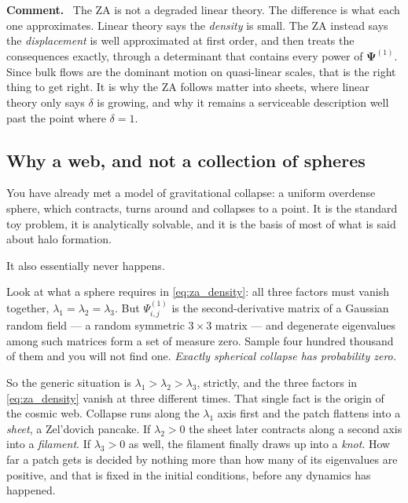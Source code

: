 \documentclass[a4paper,11pt]{article}
\newcommand{\vPsi}{\bm{\Psi}}
\numberwithin{equation}{section}
\newenvironment{remark}
  {\par\medskip\noindent\begingroup\small\color{ForestGreen!60!black}\textbf{Comment.}\ }
  {\endgroup\par\medskip}
\begin{document}
\begin{remark}
The ZA is not a degraded linear theory. The difference is what each one approximates. Linear
theory says the \emph{density} is small. The ZA instead says the
\emph{displacement} is well approximated at first order, and then treats the consequences exactly, through a determinant that contains every power of
$\vPsi^{(1)}$. Since bulk flows are the dominant motion on quasi-linear scales,
that is the right thing to get right. It is why the ZA follows matter into
sheets, where linear theory only says $\delta$ is growing, and why it remains a
serviceable description well past the point where $\delta = 1$.
\end{remark}
\subsection{Why a web, and not a collection of spheres}
\label{sec:web}

You have already met a model of gravitational collapse: a uniform overdense
sphere, which contracts, turns around and collapses to a point. It is the
standard toy problem, it is analytically solvable, and it is the basis of most
of what is said about halo formation.

It also essentially never happens.

Look at what a sphere requires in \eqref{eq:za_density}: all three factors must
vanish together, $\lambda_1 = \lambda_2 = \lambda_3$. But $\Psi^{(1)}_{i,j}$ is
the second-derivative matrix of a Gaussian random field --- a random symmetric
$3\times3$ matrix --- and degenerate eigenvalues among such matrices form a set
of measure zero. Sample four hundred thousand of them and you will not find one.
\emph{Exactly spherical collapse has probability zero.}

So the generic situation is $\lambda_1 > \lambda_2 > \lambda_3$, strictly, and
the three factors in \eqref{eq:za_density} vanish at three different times. That
single fact is the origin of the cosmic web. Collapse runs along the $\lambda_1$
axis first and the patch flattens into a \emph{sheet}, a Zel'dovich pancake. If
$\lambda_2 > 0$ the sheet later contracts along a second axis into a
\emph{filament}. If $\lambda_3 > 0$ as well, the filament finally draws up into a
\emph{knot}. How far a patch gets is decided by nothing more than how many of its eigenvalues are positive, and that is fixed in the initial conditions, before any
dynamics has happened.
\end{document}
